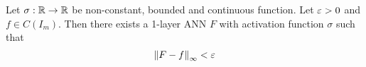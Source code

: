 

\begin{Theorem}
	Let $\sigma: \mathbb{R} \to \mathbb{R}$ be non-constant, bounded and continuous function.
	Let $\varepsilon > 0$ and $f \in C(I_m)$.
	Then there exists a 1-layer ANN $F$ with activation function $\sigma$ such that
	\[ \left\lVert F - f\right\rVert_\infty < \varepsilon \]
\end{Theorem}
